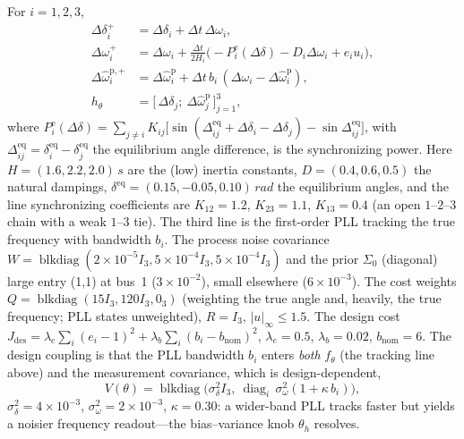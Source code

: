 \documentclass[twocolumn,amsthm]{autart}
\begin{document}
For $i=1,2,3$,
\begin{subequations}\label{eq:pll-model}
\begin{align}
\Delta\delta_i^{+} &= \Delta\delta_i + \Delta t\,\Delta\omega_i,\\
\Delta\omega_i^{+} &= \Delta\omega_i + \tfrac{\Delta t}{2H_i}
   \big(\!-P_i^{\mathrm e}(\Delta\delta) - D_i\Delta\omega_i + e_i u_i\big),\\
\Delta\hat\omega^{\mathrm p,+}_i &= \Delta\hat\omega^{\mathrm p}_i
   + \Delta t\,b_i\,(\Delta\omega_i - \Delta\hat\omega^{\mathrm p}_i),\\
h_\theta &= \big[\,\Delta\delta_j;\ \Delta\hat\omega^{\mathrm p}_j\,\big]_{j=1}^{3},
\end{align}
\end{subequations}
where $P_i^{\mathrm e}(\Delta\delta)=\sum_{j\neq i}K_{ij}\big[\sin(\Delta^{\mathrm{eq}}_{ij}
+\Delta\delta_i-\Delta\delta_j)-\sin\Delta^{\mathrm{eq}}_{ij}\big]$, with
$\Delta^{\mathrm{eq}}_{ij}=\delta^{\mathrm{eq}}_i-\delta^{\mathrm{eq}}_j$ the
equilibrium angle difference, is the synchronizing
power. Here $H=(1.6,2.2,2.0)\,\si{s}$ are the (low) inertia constants,
$D=(0.4,0.6,0.5)$ the natural dampings, $\delta^{\mathrm{eq}}=(0.15,-0.05,0.10)\,
\si{rad}$ the equilibrium angles, and the line synchronizing coefficients are
$K_{12}=1.2$, $K_{23}=1.1$, $K_{13}=0.4$ (an open $1$--$2$--$3$ chain with a weak
$1$--$3$ tie). The third line is the first-order PLL tracking the true
frequency with bandwidth $b_i$. The process noise covariance $W=\operatorname{blkdiag}
(2\!\times\!10^{-5}I_3,5\!\times\!10^{-4}I_3,5\!\times\!10^{-4}I_3)$ and the prior
$\Sigma_0$ (diagonal) large entry (1,1) at bus~1 ($3\!\times\!10^{-2}$), small elsewhere
($6\!\times\!10^{-3}$). The cost weights $Q=\operatorname{blkdiag}(15I_3,120I_3,0_3)$
(weighting the true angle and, heavily, the true frequency; PLL states
unweighted), $R=I_3$, $|u|_\infty\le1.5$. The design cost 
$J_{\mathrm{des}}=\lambda_e\sum_i(e_i-1)^2+\lambda_b\sum_i(b_i-b_{\mathrm{nom}})^2$,
$\lambda_e=0.5$, $\lambda_b=0.02$, $b_{\mathrm{nom}}=6$. The design coupling is
that the PLL bandwidth $b_i$ enters \emph{both} $f_\theta$ (the tracking line above)
and the measurement covariance, which is design-dependent,
\begin{equation}\label{eq:pll-V}
V(\theta)=\operatorname{blkdiag}\!\big(\sigma_\delta^2 I_3,\
\operatorname{diag}_i\,\sigma_\omega^2(1+\kappa\,b_i)\big),
\end{equation}
$\sigma_\delta^2=4\!\times\!10^{-3}$, $\sigma_\omega^2=2\!\times\!10^{-3}$,
$\kappa=0.30$: a wider-band PLL tracks faster but yields a noisier frequency
readout---the bias--variance knob $\theta_h$ resolves.
\end{document}
